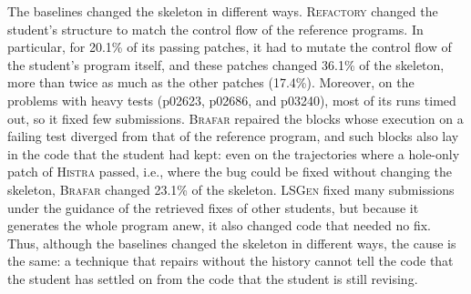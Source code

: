 \documentclass[10pt,conference]{IEEEtran}
\begin{document}
The baselines changed the skeleton in different ways. \textsc{Refactory} changed the student's structure to match the control flow of the reference programs. In particular, for 20.1\% of its passing patches, it had to mutate the control flow of the student's program itself, and these patches changed 36.1\% of the skeleton, more than twice as much as the other patches (17.4\%). Moreover, on the problems with heavy tests (p02623, p02686, and p03240), most of its runs timed out, so it fixed few submissions. \textsc{Brafar} repaired the blocks whose execution on a failing test diverged from that of the reference program, and such blocks also lay in the code that the student had kept: even on the trajectories where a hole-only patch of \textsc{Histra} passed, i.e., where the bug could be fixed without changing the skeleton, \textsc{Brafar} changed 23.1\% of the skeleton. \textsc{LSGen} fixed many submissions under the guidance of the retrieved fixes of other students, but because it generates the whole program anew, it also changed code that needed no fix. Thus, although the baselines changed the skeleton in different ways, the cause is the same: a technique that repairs without the history cannot tell the code that the student has settled on from the code that the student is still revising.
\end{document}
